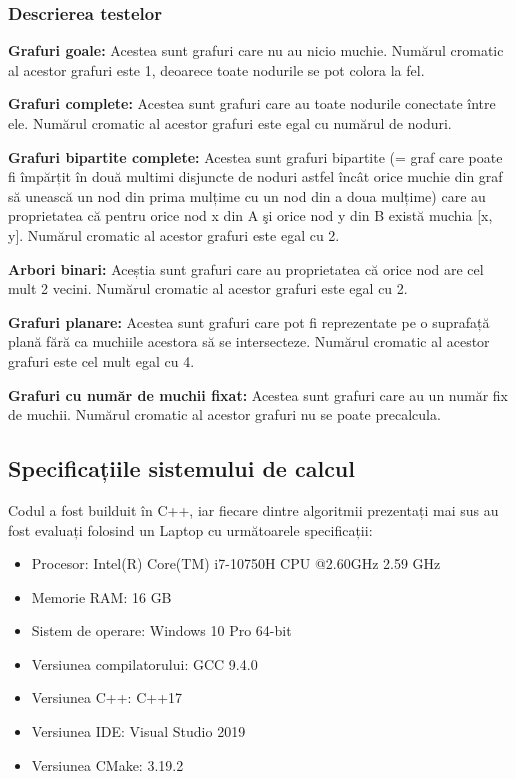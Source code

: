 \documentclass[runningheads]{paper}
\begin{document}
\subsubsection{Descrierea testelor \\}

\textbf{Grafuri goale:} Acestea sunt grafuri care nu au nicio muchie. Numărul cromatic al acestor grafuri este 1, deoarece toate nodurile se pot colora la fel.

\textbf{Grafuri complete:} Acestea sunt grafuri care au toate nodurile conectate
între ele. Numărul cromatic al acestor grafuri este egal cu numărul de noduri.

\textbf{Grafuri bipartite complete:} Acestea sunt grafuri bipartite (=  graf care
poate fi împărțit în două multimi disjuncte
de noduri astfel încât orice muchie din graf să unească un nod din prima mulțime
cu un nod din a doua mulțime) care au proprietatea
că pentru orice nod x din A şi orice nod y din B există muchia [x, y].
Numărul cromatic al acestor grafuri este egal cu 2.

\textbf{Arbori binari:} Aceștia sunt grafuri care au proprietatea că orice nod
are cel mult 2 vecini. Numărul cromatic al acestor grafuri este egal cu 2.

\textbf{Grafuri planare:} Acestea sunt grafuri care pot fi reprezentate pe o
suprafață plană fără ca muchiile acestora să se intersecteze. Numărul cromatic
al acestor grafuri este cel mult egal cu 4.

\textbf{Grafuri cu număr de muchii fixat:} Acestea sunt grafuri care au un număr
fix de muchii. Numărul cromatic al acestor grafuri nu se poate precalcula.


\subsection{Specificațiile sistemului de calcul}
Codul a fost builduit în C++, iar fiecare dintre algoritmii prezentați mai sus au fost
evaluați folosind un Laptop cu următoarele specificații:
\begin{itemize}
\item Procesor: Intel(R) Core(TM) i7-10750H CPU @2.60GHz   2.59 GHz
\item Memorie RAM: 16 GB
\item Sistem de operare: Windows 10 Pro 64-bit
\item Versiunea compilatorului: GCC 9.4.0
\item Versiunea C++: C++17
\item Versiunea IDE: Visual Studio 2019
\item Versiunea CMake: 3.19.2
\end{itemize}
\end{document}
